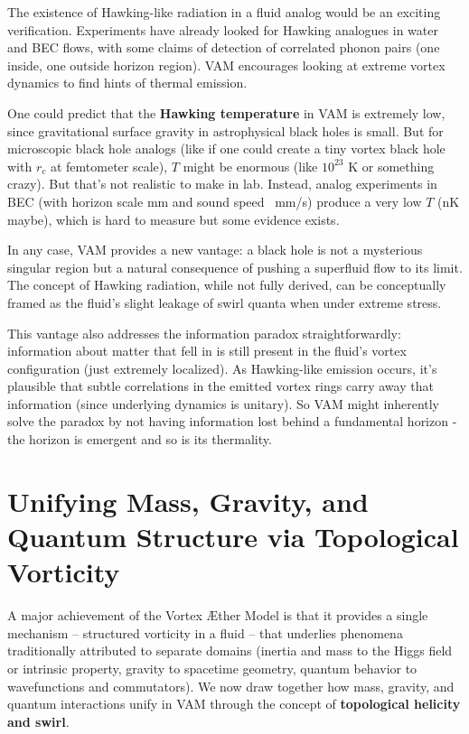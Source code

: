 \documentclass[preprint]{revtex4-2}
\begin{document}
    The existence of Hawking-like radiation in a fluid analog would be an exciting verification. Experiments have already looked for Hawking analogues in water and BEC flows, with some claims of detection of correlated phonon pairs (one inside, one outside horizon region). VAM encourages looking at extreme vortex dynamics to find hints of thermal emission.

    One could predict that the \textbf{Hawking temperature} in VAM is extremely low, since gravitational surface gravity in astrophysical black holes is small. But for microscopic black hole analogs (like if one could create a tiny vortex black hole with $r_c$ at femtometer scale), $T$ might be enormous (like $10^{23}$ K or something crazy). But that’s not realistic to make in lab. Instead, analog experiments in BEC (with horizon scale mm and sound speed ~mm/s) produce a very low $T$ (nK maybe), which is hard to measure but some evidence exists.

    In any case, VAM provides a new vantage: a black hole is not a mysterious singular region but a natural consequence of pushing a superfluid flow to its limit. The concept of Hawking radiation, while not fully derived, can be conceptually framed as the fluid’s slight leakage of swirl quanta when under extreme stress.

    This vantage also addresses the information paradox straightforwardly: information about matter that fell in is still present in the fluid’s vortex configuration (just extremely localized). As Hawking-like emission occurs, it’s plausible that subtle correlations in the emitted vortex rings carry away that information (since underlying dynamics is unitary). So VAM might inherently solve the paradox by not having information lost behind a fundamental horizon - the horizon is emergent and so is its thermality.

\section{Unifying Mass, Gravity, and Quantum Structure via Topological Vorticity}
    A major achievement of the Vortex Æther Model is that it provides a single mechanism -- structured vorticity in a fluid -- that underlies phenomena traditionally attributed to separate domains (inertia and mass to the Higgs field or intrinsic property, gravity to spacetime geometry, quantum behavior to wavefunctions and commutators). We now draw together how mass, gravity, and quantum interactions unify in VAM through the concept of \textbf{topological helicity and swirl}.
\end{document}
